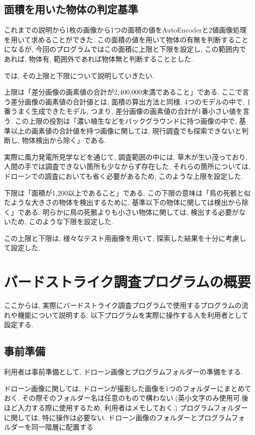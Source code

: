 \documentclass[dvipdfmx]{jsarticle}
\begin{document}
\subsection{面積を用いた物体の判定基準}
これまでの説明から1枚の画像から1つの面積の値をAutoEncoderと2値画像処理を用いて求めることができた.
この面積の値を用いて物体の有無を判断することになるが, 
今回のプログラムではこの面積に上限と下限を設定し, 
この範囲内であれば, 物体有, 範囲外であれば物体無と判断することとした.

では, その上限と下限について説明していきたい.

上限は「差分画像の画素値の合計が2,400,000未満であること」である.
ここで言う差分画像の画素値の合計値とは, 面積の算出方法と同様, 4つのモデルの中で, 1番うまく生成できたモデル, つまり, 差分画像の画素値の合計が1番小さい値を言う.
この上限の役割は「濃い植生などをバックグラウンドに持つ画像の中で, 基準以上の画素値の合計値を持つ画像に関しては, 現行調査でも探索できないと判断し, 物体検出から除く」である.

実際に風力発電所見学などを通じて, 調査範囲の中には, 草木が生い茂っており, 人間の手では調査できない箇所も少なからず存在した.
それらの箇所については, ドローンでの調査においても省く必要があるため, このような上限を設定した.

下限は「面積が1,200以上であること」である.
この下限の意味は「鳥の死骸と似たような大きさの物体を検出するために, 基準以下の物体に関しては検出から除く」である.
明らかに鳥の死骸よりも小さい物体に関しては, 検出する必要がないため, このような下限を設定した.

この上限と下限は, 様々なテスト用画像を用いて, 探索した結果を十分に考慮して設定した.


\section{バードストライク調査プログラムの概要}
ここからは, 実際にバードストライク調査プログラムで使用するプログラムの流れや機能について説明する.
以下プログラムを実際に操作する人を利用者として設定する.
\subsection{事前準備}
利用者は事前準備として, ドローン画像とプログラムフォルダーの準備をする.

ドローン画像に関しては, ドローンが撮影した画像を1つのフォルダーにまとめておく.
その際そのフォルダー名は任意のもので構わない.(英小文字のみ使用可.後ほど入力する際に使用するため, 利用者はメモしておく.)
プログラムフォルダーに関しては, 特に操作は必要ない.
ドローン画像のフォルダーとプログラムフォルダーを同一階層に配置する.
\end{document}
